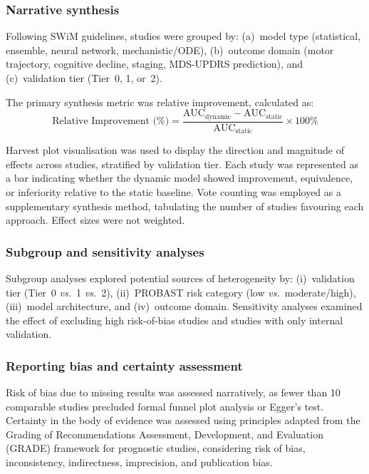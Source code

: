 \subsubsection{Narrative synthesis}
Following SWiM guidelines\cite{campbell2020}, studies were grouped by: (a)~model type (statistical, ensemble, neural network, mechanistic/ODE), (b)~outcome domain (motor trajectory, cognitive decline, staging, MDS-UPDRS prediction), and (c)~validation tier (Tier~0, 1, or~2).

The primary synthesis metric was relative improvement, calculated as:
\begin{equation}
    \text{Relative Improvement (\%)} = \frac{\text{AUC}_{\text{dynamic}} - \text{AUC}_{\text{static}}}{\text{AUC}_{\text{static}}} \times 100\%
\end{equation}

Harvest plot visualisation was used to display the direction and magnitude of effects across studies, stratified by validation tier\cite{ogilvie2008}. Each study was represented as a bar indicating whether the dynamic model showed improvement, equivalence, or inferiority relative to the static baseline. Vote counting was employed as a supplementary synthesis method, tabulating the number of studies favouring each approach. Effect sizes were not weighted.

\subsubsection{Subgroup and sensitivity analyses}
Subgroup analyses explored potential sources of heterogeneity by: (i)~validation tier (Tier~0 \textit{vs.}~1 \textit{vs.}~2), (ii)~PROBAST risk category (low \textit{vs.}\ moderate/high), (iii)~model architecture, and (iv)~outcome domain. Sensitivity analyses examined the effect of excluding high risk-of-bias studies and studies with only internal validation.

\subsubsection{Reporting bias and certainty assessment}
Risk of bias due to missing results was assessed narratively, as fewer than 10 comparable studies precluded formal funnel plot analysis or Egger's test. Certainty in the body of evidence was assessed using principles adapted from the Grading of Recommendations Assessment, Development, and Evaluation (GRADE) framework for prognostic studies\cite{huguet2013}, considering risk of bias, inconsistency, indirectness, imprecision, and publication bias.

